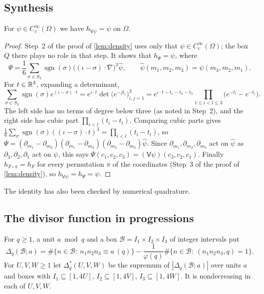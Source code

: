 \documentclass[11pt,colorlinks]{charlie}
\newcommand{\Om}{\Omega}
\begin{document}
\subsection{Synthesis}
\begin{lemma}[Synthesis]\label{lem:synthesis}
For $\psi\in C_c^\infty(\Om)$ we have $h_{\mathsf V\psi}=\psi$ on $\Om$.
\end{lemma}
\begin{proof}
Step~2 of the proof of \cref{lem:density} uses only that $\psi\in C_c^\infty(\Om)$; the box $Q$ there plays no role in that step. It shows that $h_\Psi=\psi$, where
\[
 \Psi=\frac16\sum_{\sigma\in S_3}\operatorname{sgn}(\sigma)\big((\iota-\sigma)\cdot\nabla\big)^3\hat\psi,\qquad\hat\psi(m_1,m_2,m_3)=\psi(m_3,m_2,m_1).
\]
For $t\in\mathbb{R}^3$, expanding a determinant,
\[
 \sum_{\sigma\in S_3}\operatorname{sgn}(\sigma)e^{(\iota-\sigma)\cdot t}=e^{\iota\cdot t}\det\big(e^{-jt_i}\big)_{i,j=1}^3=e^{\iota\cdot t-t_1-t_2-t_3}\prod_{1\le i<l\le3}\big(e^{-t_l}-e^{-t_i}\big).
\]
The left side has no terms of degree below three (as noted in Step~2), and the right side has cubic part $\prod_{i<l}(t_i-t_l)$. Comparing cubic parts gives $\frac16\sum_\sigma\operatorname{sgn}(\sigma)((\iota-\sigma)\cdot t)^3=\prod_{i<l}(t_i-t_l)$, so $\Psi=(\partial_{m_1}-\partial_{m_2})(\partial_{m_1}-\partial_{m_3})(\partial_{m_2}-\partial_{m_3})\hat\psi$. Since $\partial_{m_1},\partial_{m_2},\partial_{m_3}$ act on $\hat\psi$ as $\partial_3,\partial_2,\partial_1$ act on $\psi$, this says $\Psi(c_1,c_2,c_3)=(\mathsf V\psi)(c_3,c_2,c_1)$. Finally $h_{F\circ\pi}=h_F$ for every permutation $\pi$ of the coordinates (Step~3 of the proof of \cref{lem:density}), so $h_{\mathsf V\psi}=h_\Psi=\psi$.
\end{proof}
\noindent The identity has also been checked by numerical quadrature.

\subsection{The divisor function in progressions}
For $q\ge1$, a unit $a\bmod q$ and a box $\mathcal B=I_1\times I_2\times I_3$ of integer intervals put
\[
 \Delta_q(\mathcal B;a)=\#\{n\in\mathcal B:\ n_1n_2n_3\equiv a\ (q)\}-\frac1{\varphi(q)}\#\{n\in\mathcal B:\ (n_1n_2n_3,q)=1\}.
\]
For $U,V,W\ge1$ let $\Delta^*_q(U,V,W)$ be the supremum of $|\Delta_q(\mathcal B;a)|$ over units $a$ and boxes with $I_1\subseteq[1,4U]$, $I_2\subseteq[1,4V]$, $I_3\subseteq[1,4W]$. It is nondecreasing in each of $U,V,W$.
\end{document}
